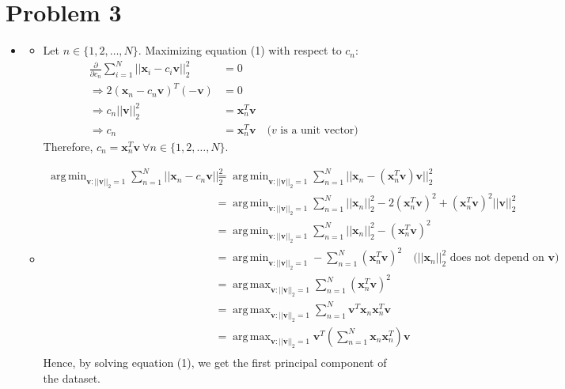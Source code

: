 \documentclass{article}
\newcommand{\mbi}[1]{\boldsymbol{#1}}
\DeclareMathOperator*{\argmin}{arg\,min}
\DeclareMathOperator*{\argmax}{arg\,max}
\begin{document}
\section{Problem 3}
  \begin{itemize}
    \item[\textbf{3.1}]
    \begin{itemize}
      \item[1)] Let $n \in \{1, 2, \ldots, N\}$.
      Maximizing equation (1) with respect to $c_n$:
      \begin{align*}
        \frac{\partial}{\partial c_n} \sum_{i=1}^N ||\mbi{x}_i - c_i \mbi{v}||_2^2 &= 0 \\
        \Rightarrow 2(\mbi{x}_n - c_n \mbi{v})^T (-\mbi{v}) &= 0 \\
        \Rightarrow c_n ||\mbi{v}||_2^2 &= \mbi{x}_n^T \mbi{v} \\
        \Rightarrow c_n &= \mbi{x}_n^T \mbi{v} \quad \text{($v$ is a unit vector)}
      \end{align*}
      Therefore, $c_n = \mbi{x}_n^T \mbi{v} ~ \forall n \in \{1, 2, \ldots, N\}$.

      \item[2)]
      \begin{align*}
        \argmin_{\mbi{v}:||\mbi{v}||_2=1} \sum_{n=1}^N ||\mbi{x}_n - c_n \mbi{v}||_2^2 &= \argmin_{\mbi{v}:||\mbi{v}||_2=1} \sum_{n=1}^N ||\mbi{x}_n - (\mbi{x}_n^T \mbi{v}) \mbi{v}||_2^2 \\
        &= \argmin_{\mbi{v}:||\mbi{v}||_2=1} \sum_{n=1}^N ||\mbi{x}_n||_2^2 - 2(\mbi{x}_n^T \mbi{v})^2 + (\mbi{x}_n^T \mbi{v})^2 ||\mbi{v}||_2^2 \\
        &= \argmin_{\mbi{v}:||\mbi{v}||_2=1} \sum_{n=1}^N ||\mbi{x}_n||_2^2 - (\mbi{x}_n^T \mbi{v})^2 \\
        &= \argmin_{\mbi{v}:||\mbi{v}||_2=1} -\sum_{n=1}^N (\mbi{x}_n^T \mbi{v})^2 \quad \text{($||\mbi{x}_n||_2^2$ does not depend on $\mbi{v}$)} \\
        &= \argmax_{\mbi{v}:||\mbi{v}||_2=1} \sum_{n=1}^N (\mbi{x}_n^T \mbi{v})^2 \\
        &= \argmax_{\mbi{v}:||\mbi{v}||_2=1} \sum_{n=1}^N \mbi{v}^T \mbi{x}_n \mbi{x}_n^T \mbi{v} \\
        &= \argmax_{\mbi{v}:||\mbi{v}||_2=1} \mbi{v}^T \left( \sum_{n=1}^N \mbi{x}_n \mbi{x}_n^T \right) \mbi{v} \\
      \end{align*}
      Hence, by solving equation (1), we get the first principal component of the dataset.
    \end{itemize}


\end{itemize}
\end{document}
